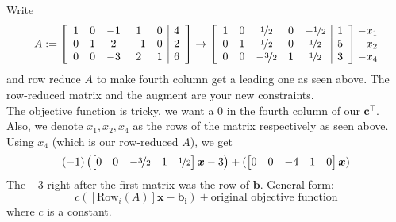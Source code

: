 Write
\[A:=
\left[\begin{array}{ccccc|c}  
    1 & 0 & -1 & 1 & 0 & 4\\
    0 & 1 & 2 & -1 & 0 & 2\\
    0 & 0 & -3 & 2 & 1 & 6
\end{array}\right]
\rightarrow
\left[\begin{array}{ccccc|c}
    1 & 0 & \nicefrac{1}{2} & 0 & -\nicefrac{1}{2} & 1\\
    0 & 1 & \nicefrac{1}{2} & 0 & \nicefrac{1}{2} & 5\\
    0 & 0 & -\nicefrac{3}{2} & 1 & \nicefrac{1}{2} & 3
\end{array}\right]
\begin{matrix}
    -x_1\\
    -x_2\\
    -x_4
\end{matrix}
\]
and row reduce $A$ to make fourth column get a leading one as seen above.
The row-reduced matrix and the augment are your new constraints.\\
The objective function is tricky, we want a 0 in the fourth column of our $\bm{c}^\top $.
Also, we denote $x_1,x_2,x_4$ as the rows of the matrix respectively as seen above.
Using $x_4$ (which is our row-reduced $A$), we get
\[(-1)\left(
\begin{bmatrix}
    0 & 0 & -\nicefrac{3}{2} & 1 & \nicefrac{1}{2}
\end{bmatrix}\bm{x}-3\right)+
(\begin{bmatrix}
    0 & 0 & -4 & 1 & 0
\end{bmatrix}\bm{x})
\]
The $-3$ right after the first matrix was the row of $\bm{b}$. General form:
\[ c([\text{Row}_i(A)]\bm{x}-\bm{b_i})+\text{original objective function} \]
where $ c $ is a constant.

